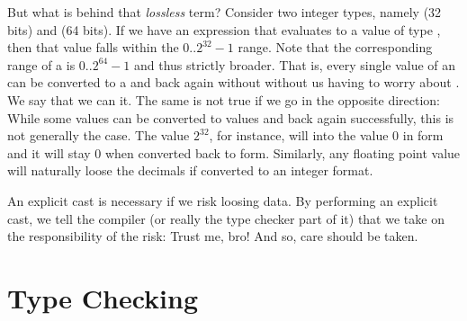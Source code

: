\begin{syntaxfloat}
  
  \caption{Casting of an expression to a different type.}
  \label{syntax:prim:cast}
\end{syntaxfloat}

But what is behind that \textsl{lossless} term? Consider two integer types, namely  (32 bits) and  (64 bits). If we have an expression that evaluates to a value of type , then that value falls within the $0..2^{32}-1$ range. Note that the corresponding range of a  is $0..2^{64}-1$ and thus strictly broader. That is, every single value of an  can be converted to a  and back again without without us having to worry about . We say that we can  it. The same is not true if we go in the opposite direction: While some  values can be converted to  values and back again successfully, this is not generally the case. The value $2^{32}$, for instance, will  into the value $0$ in  form and it will stay $0$ when converted back to  form. Similarly, any floating point value will naturally loose the decimals if converted to an integer format.

An explicit cast is necessary if we risk loosing data. By performing an explicit cast, we tell the compiler (or really the type checker part of it) that we take on the responsibility of the risk: Trust me, bro! And so, care should be taken.

\section{Type Checking}

